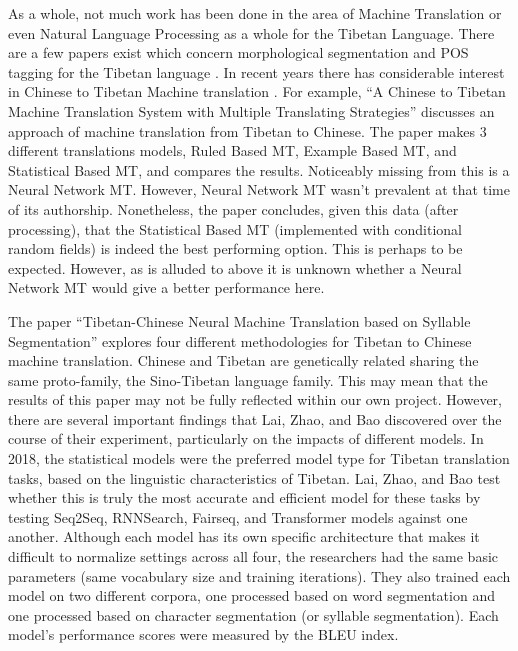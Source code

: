 \documentclass[letterpaper, 12 pt, conference]{ieeeconf}  %
\begin{document}
As a whole, not much work has been done in the area of Machine Translation or even Natural Language Processing as a whole for the Tibetan Language. There are a few papers exist which concern morphological segmentation and POS tagging for the Tibetan language \cite{c3} \cite{c4}. In recent years there has considerable interest in Chinese to Tibetan Machine translation \cite{c1} \cite{c2}. For example, “A Chinese to Tibetan Machine Translation System with Multiple Translating Strategies” discusses an approach of machine translation from Tibetan to Chinese. The paper makes 3 different translations models, Ruled Based MT, Example Based MT, and Statistical Based MT,  and compares the results. Noticeably missing from this is a Neural Network MT. However, Neural Network MT wasn’t prevalent at that time of its authorship. Nonetheless, the paper concludes, given this data (after processing), that the Statistical Based MT (implemented with conditional random fields) is indeed the best performing option. This is perhaps to be expected. However, as is alluded to above it is unknown whether a Neural Network MT would give a better performance here.

The paper “Tibetan-Chinese Neural Machine Translation based on Syllable Segmentation” explores four different methodologies for Tibetan to Chinese machine translation. Chinese and Tibetan are genetically related sharing the same proto-family, the Sino-Tibetan language family. This may mean that the results of this paper may not be fully reflected within our own project. However, there are several important findings that Lai, Zhao, and Bao discovered over the course of their experiment, particularly on the impacts of different models. In 2018, the statistical models were the preferred model type for Tibetan translation tasks, based on the linguistic characteristics of Tibetan. Lai, Zhao, and Bao test whether this is truly the most accurate and efficient model for these tasks by testing Seq2Seq, RNNSearch, Fairseq, and Transformer models against one another. Although each model has its own specific architecture that makes it difficult to normalize settings across all four, the researchers had the same basic parameters (same vocabulary size and training iterations). They also trained each model on two different corpora, one processed based on word segmentation and one processed based on character segmentation (or syllable segmentation). Each model’s performance scores were measured by the BLEU index.
\end{document}
